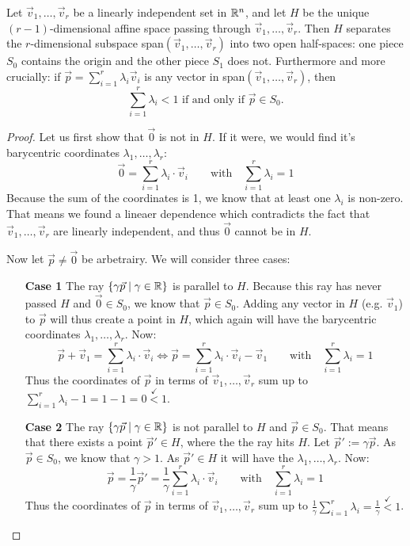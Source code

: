 \begin{lemma}
    \label{lemma:affine_space}
    Let $\vec v_1,\dots,\vec v_r$ be a linearly independent set in $\mathbb{R}^n$, and let $H$ be the unique $(r-1)$-dimensional affine space passing through $\vec v_1,\dots,\vec v_r$. Then $H$ separates the $r$-dimensional subspace span$(\vec v_1,\dots,\vec v_r)$ into two open half-spaces: one piece $S_0$ contains the origin and the other piece $S_1$ does not. Furthermore and more crucially: if $\vec p = \sum_{i=1}^r \lambda_i \vec v_i$ is any vector in span$(\vec v_1,\dots,\vec v_r)$, then
    $$
    \sum_{i=1}^r \lambda_i < 1 \text{ if and only if } \vec p \in S_0.
    $$
\end{lemma}
\begin{proof}
    Let us first show that $\vec 0$ is not in $H$. If it were, we would find it's barycentric coordinates $\lambda_1, \dots, \lambda_r$:
    $$\vec 0 = \sum_{i=1}^r \lambda_i \cdot \vec v_i \qquad\mathrm{with}\quad\sum_{i=1}^{r}\lambda_i = 1$$
    Because the sum of the coordinates is 1, we know that at least one $\lambda_i$ is non-zero. That means we found a lineaer dependence which contradicts the fact that $\vec v_1,\dots,\vec v_r$ are linearly independent, and thus $\vec 0$ cannot be in $H$.

    Now let $\vec p \neq \vec 0$ be arbetrairy. We will consider three cases:
    \begin{itemize}
        \item[\textbf{Case 1}] The ray $\{\gamma\vec p\mid \gamma \in \mathbb{R}\}$ is parallel to $H$. Because this ray has never passed $H$ and $\vec 0 \in S_0$, we know that $\vec p \in S_0$. Adding any vector in $H$ (e.g. $\vec v_1$) to $\vec p$ will thus create a point in $H$, which again will have the barycentric coordinates $\lambda_1, \dots, \lambda_r$. Now:
        $$\vec p + \vec v_1 = \sum_{i=1}^{r}\lambda_i\cdot \vec v_i \Leftrightarrow \vec p = \sum_{i=1}^{r}\lambda_i\cdot \vec v_i - \vec v_1\qquad\mathrm{with}\quad\sum_{i=1}^{r}\lambda_i = 1$$
        Thus the coordinates of $\vec p$ in terms of $\vec v_1, \dots, \vec v_r$ sum up to $\sum_{i=1}^{r}\lambda_i - 1 = 1 - 1 = 0 \stackrel{\checkmark}{<} 1$.

        \item[\textbf{Case 2}] The ray $\{\gamma\vec p\mid \gamma \in \mathbb{R}\}$ is not parallel to $H$ and $\vec p \in S_0$. That means that there exists a point $\vec p' \in H$, where the the ray hits $H$. Let $\vec p' := \gamma \vec p$. As $\vec p \in S_0$, we know that $\gamma > 1$. As $\vec p' \in H$ it will have the $\lambda_1, \dots, \lambda_r$. Now:
        $$\vec p = \frac{1}{\gamma}\vec p' = \frac{1}{\gamma} \sum_{i=1}^{r}\lambda_i\cdot \vec v_i \qquad\mathrm{with}\quad\sum_{i=1}^{r}\lambda_i = 1$$
        Thus the coordinates of $\vec p$ in terms of $\vec v_1, \dots, \vec v_r$ sum up to $\frac{1}{\gamma}\sum_{i=1}^{r}\lambda_i = \frac{1}{\gamma}\stackrel{\checkmark}{<} 1$.


\end{itemize}
\end{proof}
